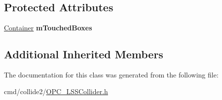 \subsection*{Protected Attributes}
\begin{DoxyCompactItemize}
\item 
\hyperlink{classContainer}{Container} {\bfseries m\+Touched\+Boxes}\hypertarget{classHybridLSSCollider_a6c681a5e01363be23e42b9699a9fbe67}{}\label{classHybridLSSCollider_a6c681a5e01363be23e42b9699a9fbe67}

\end{DoxyCompactItemize}
\subsection*{Additional Inherited Members}


The documentation for this class was generated from the following file\+:\begin{DoxyCompactItemize}
\item 
cmd/collide2/\hyperlink{OPC__LSSCollider_8h}{O\+P\+C\+\_\+\+L\+S\+S\+Collider.\+h}\end{DoxyCompactItemize}
